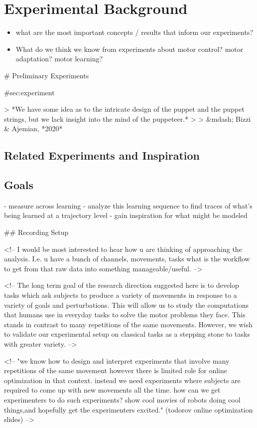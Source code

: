 \documentclass[../main.tex]{subfiles}
\begin{document}
\chapter{Experimental Background}\label{chap:bg_experimental}

\begin{itemize}
\tightlist
\item
  what are the most important concepts / results that inform our
  experiments?
\item
  What do we think we know from experiments about motor control? motor
  adaptation? motor learning?
\end{itemize}

# Preliminary Experiments

{#sec:experiment}

> *We have some idea as to the intricate design of the puppet and the puppet strings, but we lack insight into the mind of the puppeteer.*
>
> &mdash; Bizzi & Ajemian, *2020*

\section{Related Experiments and Inspiration}

\section{Goals}

- measure across learning
- analyze this learning sequence to find traces of what's being learned at a trajectory level
- gain inspiration for what might be modeled

## Recording Setup

<!-- I would be most interested to hear how u are thinking of approaching the analysis. I.e. u have a bunch of channels, movements, tasks what is the workflow to get from that raw data into something manageable/useful. -->


<!-- The long term goal of the research direction suggested here is to develop tasks which ask subjects to produce a variety of movements in response to a variety of goals and perturbations. This will allow us to study the computations that humans use in everyday tasks to solve the motor problems they face. This stands in contrast to many repetitions of the same movements. However, we wish to validate our experimental setup on classical tasks as a stepping stone to tasks with greater variety. -->

<!-- "we know how to design and interpret experiments that involve many repetitions of the same movement however there is limited role for online optimization in that context. instead we need experiments where subjects are required to come up with new movements all the time. how can we get experimenters to do such experiments? show cool movies of robots doing cool things,and hopefully get the experimenters excited." (todorov online optimization slides) -->
\end{document}
